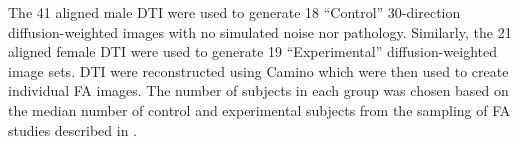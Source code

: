 \documentclass[final,5p,times,twocolumn]{elsarticle}
\newcommand{\lstsetcpp}
{
\lstset{frame = tb,
        framerule = 0.25pt,
        float,
        fontadjust,
        backgroundcolor={\color{listlightgray}},
        basicstyle = {\ttfamily\scriptsize},
        keywordstyle = {\ttfamily\color{listkeyword}\textbf},
        identifierstyle = {\ttfamily},
        commentstyle = {\ttfamily\color{listcomment}\textit},
        stringstyle = {\ttfamily},
        showstringspaces = false,
        showtabs = false,
        numbers = none,
        numbersep = 6pt,
        numberstyle={\ttfamily\color{listnumbers}},
        tabsize = 2,
        language=[ANSI]C++,
        floatplacement=!h,
        caption={\small {\ttfamily CreateDTICohort} which implements the a ground truth DTI simulator \cite{van-hecke2009}.  The short command line menu which is invoked using the  `{\ttfamily {-}h}'  option.  The long command line menu is obtained by typing `{\ttfamily {-}{-}help}'},
        captionpos=b,
        }
}
\begin{document}
The 41 aligned male DTI were used to generate 18 ``Control'' 30-direction
diffusion-weighted images
with no simulated noise nor pathology.  Similarly, the 21 aligned female
DTI were used to generate 19 ``Experimental'' diffusion-weighted image sets.
DTI were reconstructed using Camino which were then used to create
individual FA images.
The number of subjects in each
group was chosen based on the median number of control and experimental
subjects from the sampling of FA studies described in 
\cite{van-hecke2009}.  




%
%
\end{document}
